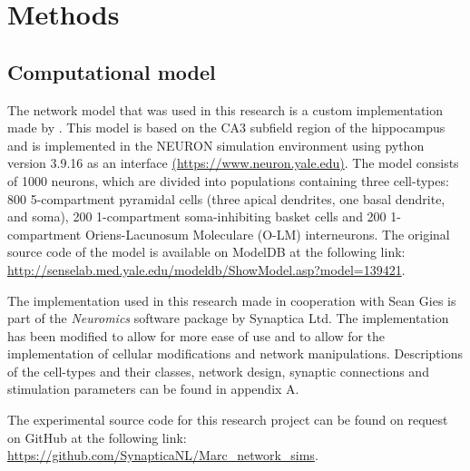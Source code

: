 \chapter{Methods}

\section{Computational model}
The network model that was used in this research is a custom implementation
made by \textcite{sanjayImpairedDendriticInhibition2015}. This model is based
on the CA3 subfield region of the hippocampus and is implemented in the NEURON
simulation environment using python version 3.9.16 as an interface
\href{https://www.neuron.yale.edu}{(\url{https://www.neuron.yale.edu})}. The
model consists of 1000 neurons, which are divided into populations containing
three cell-types: 800 5-compartment pyramidal cells (three apical dendrites,
one basal dendrite, and soma), 200 1-compartment soma-inhibiting basket cells
and 200 1-compartment Oriens-Lacunosum Moleculare (O-LM) interneurons. The
original source code of the model is available on ModelDB at the following
link:
\href{http://senselab.med.yale.edu/modeldb/ShowModel.asp?model=139421}{\url{http://senselab.med.yale.edu/modeldb/ShowModel.asp?model=139421}}.

The implementation used in this research made in cooperation with Sean Gies is
part of the \textit{Neuromics} software package by Synaptica Ltd. The
implementation has been modified to allow for more ease of use and to allow for
the implementation of cellular modifications and network manipulations.
Descriptions of the cell-types and their classes, network design, synaptic
connections and stimulation parameters can be found in appendix A.

The experimental source code for this research project can be found on request
on GitHub at the following link:
\href{https://github.com/SynapticaNL/Marc_network_sims}{\url{https://github.com/SynapticaNL/Marc_network_sims}}.

